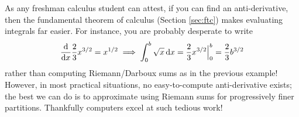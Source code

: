 % 

As any freshman calculus student can attest, if you can find an anti-derivative, then the fundamental theorem of calculus (Section \ref{sec:ftc}) makes evaluating integrals far easier. For instance, you are probably desperate to write
\[
	\frac{\mathrm{d} }{\mathrm{d} x}\frac 23x^{3/2}=x^{1/2}
	\implies \int_0^b\sqrt x\,{\mathrm{d} x}
	=\frac 23x^{3/2}\Big|_0^b
	=\frac 23b^{3/2}
\]
rather than computing Riemann/Darboux sums as in the previous example! However, in most practical situations, no easy-to-compute anti-derivative exists; the best we can do is to approximate using Riemann sums for progressively finer partitions. Thankfully computers excel at such tedious work!


